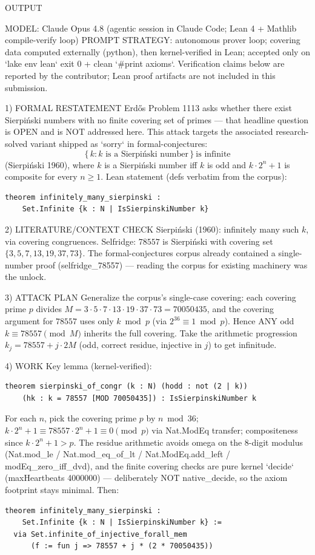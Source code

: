 
OUTPUT

MODEL: Claude Opus 4.8 (agentic session in Claude Code; Lean 4 + Mathlib compile-verify loop)
PROMPT STRATEGY: autonomous prover loop; covering data computed externally (python), then
kernel-verified in Lean; accepted only on `lake env lean` exit 0 + clean `#print axioms`.
Verification claims below are reported by the contributor;
Lean proof artifacts are not included in this submission.

1) FORMAL RESTATEMENT
Erdős Problem 1113 asks whether there exist Sierpiński numbers with no finite covering set
of primes — that headline question is OPEN and is NOT addressed here. This attack targets
the associated research-solved variant shipped as `sorry` in formal-conjectures:
\[
\{\,k : k \text{ is a Sierpiński number}\,\}\ \text{is infinite}
\]
(Sierpiński 1960), where $k$ is a Sierpiński number iff $k$ is odd and $k\cdot 2^n+1$ is
composite for every $n\ge 1$. Lean statement (defs verbatim from the corpus):
\begin{verbatim}
theorem infinitely_many_sierpinski :
    Set.Infinite {k : N | IsSierpinskiNumber k}
\end{verbatim}

2) LITERATURE/CONTEXT CHECK
Sierpiński (1960): infinitely many such $k$, via covering congruences. Selfridge:
$78557$ is Sierpiński with covering set $\{3,5,7,13,19,37,73\}$. The formal-conjectures
corpus already contained a single-number proof (selfridge_78557) — reading the corpus for
existing machinery was the unlock.

3) ATTACK PLAN
Generalize the corpus's single-case covering: each covering prime $p$ divides
$M = 3\cdot5\cdot7\cdot13\cdot19\cdot37\cdot73 = 70050435$, and the covering argument for
$78557$ uses only $k \bmod p$ (via $2^{36} \equiv 1 \bmod p$). Hence ANY odd
$k \equiv 78557 \pmod{M}$ inherits the full covering. Take the arithmetic progression
$k_j = 78557 + j\cdot 2M$ (odd, correct residue, injective in $j$) to get infinitude.

4) WORK
Key lemma (kernel-verified):
\begin{verbatim}
theorem sierpinski_of_congr (k : N) (hodd : not (2 | k))
    (hk : k = 78557 [MOD 70050435]) : IsSierpinskiNumber k
\end{verbatim}
For each $n$, pick the covering prime $p$ by $n \bmod 36$; $k\cdot2^n+1 \equiv
78557\cdot2^n+1 \equiv 0 \pmod p$ via Nat.ModEq transfer; compositeness since
$k\cdot2^n+1 > p$. The residue arithmetic avoids omega on the 8-digit modulus
(Nat.mod_le / Nat.mod_eq_of_lt / Nat.ModEq.add_left / modEq_zero_iff_dvd), and the
finite covering checks are pure kernel `decide` (maxHeartbeats 4000000) — deliberately
NOT native_decide, so the axiom footprint stays minimal. Then:
\begin{verbatim}
theorem infinitely_many_sierpinski :
    Set.Infinite {k : N | IsSierpinskiNumber k} :=
  via Set.infinite_of_injective_forall_mem
      (f := fun j => 78557 + j * (2 * 70050435))
\end{verbatim}

